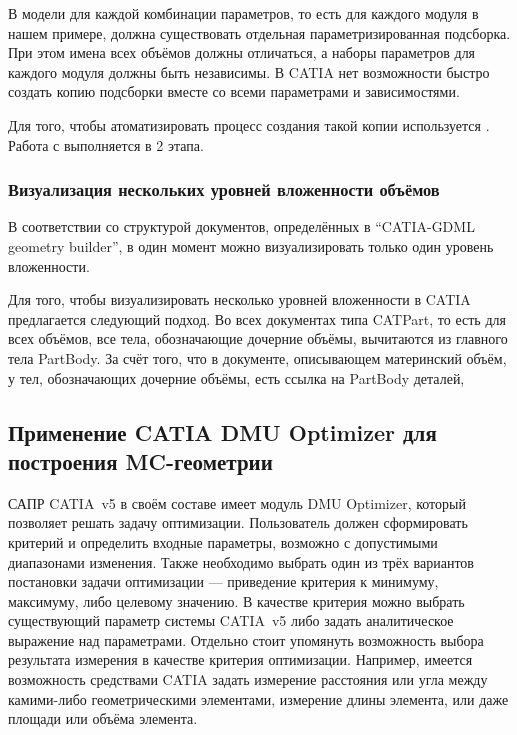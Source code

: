 В модели для каждой комбинации параметров, то есть для каждого модуля в нашем примере, должна существовать отдельная параметризированная подсборка. При этом имена всех объёмов должны отличаться, а наборы параметров для каждого модуля должны быть независимы. В CATIA нет возможности быстро создать копию подсборки вместе со всеми параметрами и зависимостями.

Для того, чтобы атоматизировать процесс создания такой копии используется .
Работа с  выполняется в 2 этапа.

\todo

\subsubsection{Визуализация нескольких уровней вложенности объёмов}\label{sec:MultiLevelVis}

В соответствии со структурой документов, определённых в ``CATIA-GDML geometry builder'', в один момент можно визуализировать только один уровень вложенности.

Для того, чтобы визуализировать несколько уровней вложенности в CATIA предлагается следующий подход. Во всех документах типа CATPart, то есть для всех объёмов, все тела, обозначающие дочерние объёмы, вычитаются из главного тела PartBody. За счёт того, что в документе, описывающем материнский объём, у тел, обозначающих дочерние объёмы, есть ссылка на PartBody деталей, 
\todo


\subsection{Применение CATIA DMU Optimizer для построения MC-геометрии}\label{sec:CATIAoptimize}

САПР CATIA~v5 в своём составе имеет модуль DMU Optimizer, который позволяет решать задачу оптимизации. Пользователь должен сформировать критерий и определить входные параметры, возможно с допустимыми диапазонами изменения. Также необходимо выбрать один из трёх вариантов постановки задачи оптимизации --- приведение критерия к минимуму, максимуму, либо целевому значению. В качестве критерия можно выбрать существующий параметр системы CATIA~v5 либо задать аналитическое выражение над параметрами. Отдельно стоит упомянуть возможность выбора результата измерения в качестве критерия оптимизации. Например, имеется возможность средствами CATIA задать измерение расстояния или угла между камими-либо геометрическими элементами, измерение длины элемента, или даже площади или объёма элемента.

